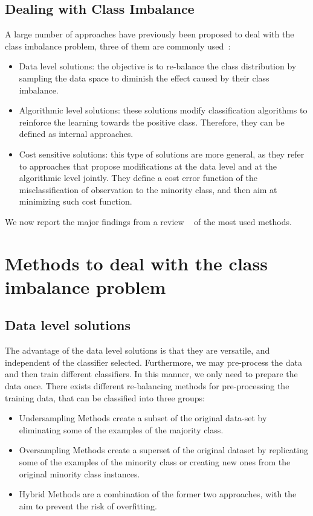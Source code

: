 \section{Dealing with  Class Imbalance}
A large number of approaches have previously been proposed to deal with the class imbalance problem, three of them  are commonly used~\cite{krawczyk2016learning}:
\begin{itemize}
    \item{Data level solutions: the objective is to re-balance the class distribution by sampling the data space to diminish the effect caused by their class imbalance.}
    \item{Algorithmic level solutions: these solutions  modify classification algorithms to reinforce the learning towards the positive class. Therefore, they can be defined as internal approaches.}
    \item{Cost sensitive solutions: this type of solutions are more general, as they refer to approaches that propose modifications at the data level and at the algorithmic level jointly. They define a cost error function of the misclassification of observation to the minority class, and then aim at minimizing such cost function.}
\end{itemize}
\noindent
We now report the major findings from a review ~\cite{more2016survey} of the most used methods.

\chapter{Methods to deal with the class imbalance problem}
\section{Data level solutions}
The advantage of the data level solutions is that they are  versatile, and independent of the classifier selected. Furthermore, we may pre-process the data and then train  different classifiers. In this manner, we only need to prepare the data once. There exists different re-balancing methods for pre-processing the training data, that can be classified into three groups:
\begin{itemize}
\item{Undersampling Methods  create a subset of the original data-set by eliminating some of the examples of the majority class.}
\item{Oversampling Methods create a superset of the original dataset by replicating some of the examples of the minority class or creating new ones from the original minority class instances.}
\item{Hybrid Methods are a combination of the former two approaches, with the aim to prevent the risk of overfitting.
}
\end{itemize}


